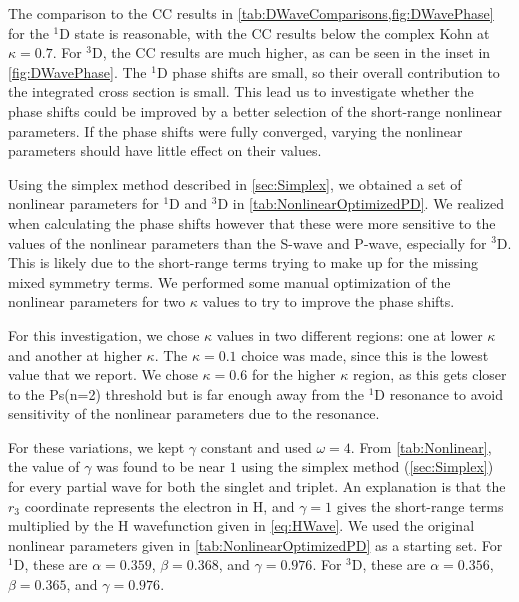 \documentclass[Dissertation.tex]{subfiles}
\begin{document}
The comparison to the CC results \cite{Walters2004,Blackwood2002}
in \cref{tab:DWaveComparisons,fig:DWavePhase} for the $^1$D state is
reasonable, with the CC results below the complex Kohn at $\kappa = 0.7$.
For $^3$D, the CC results are much higher, as can be seen in the inset
in \cref{fig:DWavePhase}. The $^1$D phase shifts are small, so their overall
contribution to the integrated cross section is small. 
This lead us to investigate whether the phase shifts could be improved by a
better selection of the short-range nonlinear parameters. If the phase shifts
were fully converged, varying the nonlinear parameters should have little
effect on their values.

Using the simplex method described in \cref{sec:Simplex}, we obtained a set of
nonlinear parameters for $^1$D and $^3$D in \cref{tab:NonlinearOptimizedPD}.
We realized when calculating the phase shifts however that these were more
sensitive to the values of the nonlinear parameters than the S-wave and P-wave,
especially for $^3$D. This is likely due to the short-range terms trying to
make up for the missing mixed symmetry terms. We performed some manual
optimization of the nonlinear parameters for two $\kappa$ values to try to
improve the phase shifts.

For this investigation, we chose $\kappa$ values in two different regions:
one at lower $\kappa$ and another at higher $\kappa$. The $\kappa = 0.1$ choice
was made, since this is the lowest value that we report. We chose $\kappa = 0.6$
for the higher $\kappa$ region, as this gets closer to the Ps(n=2) threshold
but is far enough away from the $^1$D resonance to avoid sensitivity of the
nonlinear parameters due to the resonance.

For these variations, we kept $\gamma$ constant and used $\omega = 4$. From 
\cref{tab:Nonlinear}, the value of $\gamma$ was found to be near $1$ using 
the simplex method (\cref{sec:Simplex}) for every partial wave for both the 
singlet and triplet. An explanation is that the $r_3$ coordinate represents 
the electron in H, and $\gamma = 1$ gives the short-range terms multiplied by 
the H wavefunction given in \cref{eq:HWave}. We used the original nonlinear 
parameters given in \cref{tab:NonlinearOptimizedPD} as a starting set. For
$^1$D, these are $\alpha = 0.359$, $\beta = 0.368$, and $\gamma = 0.976$. For
$^3$D, these are $\alpha = 0.356$, $\beta = 0.365$, and $\gamma = 0.976$.
\end{document}
